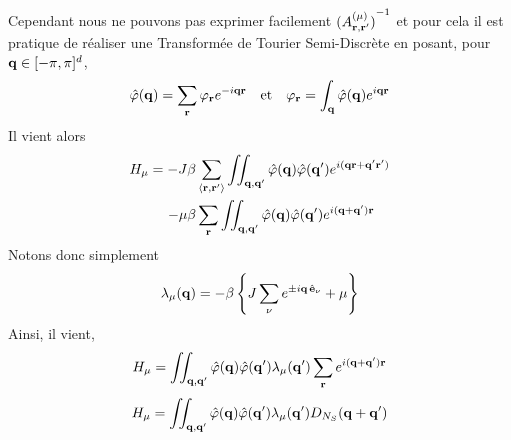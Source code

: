 \documentclass[10pt]{article}
\begin{document}
\begin{multicols}{2}
Cependant nous ne pouvons pas exprimer facilement ${(A_{{\bf r}, {\bf r}'}^{(\mu)})}^{-1}$ et pour cela il est pratique de réaliser une Transformée de Tourier Semi-Discrète   en posant, pour ${\bf q} \in [-\pi, \pi]^d$,
\begin{equation}
  \hat{\varphi}({\bf q}) = \sum_{\bf r} \varphi_{\bf r} e^{-i{\bf q}{\bf r}} \quad \text{et} \quad \varphi_{\bf r} = \int_{\bf q} \hat{\varphi}({\bf q})  e^{i{\bf q}{\bf r}}
\end{equation}
Il vient alors
\begin{equation}
\begin{split}
  H_\mu = -J\beta & \sum_{\left<{\bf r}, {\bf r}'\right>} \iint_{{\bf q},{\bf q}'} \hat{\varphi}({\bf q}) \hat{\varphi}({\bf q}')  e^{i({\bf q}{\bf r}+{\bf q}'{\bf r}')} \\
   -\mu\beta & \sum_{\bf r} \iint_{{\bf q},{\bf q}'} \hat{\varphi}({\bf q}) \hat{\varphi}({\bf q}')  e^{i({\bf q}+{\bf q}'){\bf r}}
\end{split}
\end{equation}
Notons donc simplement
\begin{equation}
  \lambda_\mu({\bf q}) = -\beta \left\{ J\sum_{\nu} e^{ \pm i {\bf q} \, \hat{\mathbf{e}}_\nu} +\mu \right\} 
\end{equation}
Ainsi, il vient, 
\begin{equation}
  H_\mu =   \iint_{{\bf q},{\bf q}'} \hat{\varphi}({\bf q}) \hat{\varphi}({\bf q}')   \lambda_\mu({\bf q}')   \sum_{{\bf r}}  e^{i({\bf q}+{\bf q}'){\bf r}} \\
\end{equation}
\begin{equation}
  H_\mu =   \iint_{\qv,\qv'} \hat{\varphi}(\qv) \hat{\varphi}(\qv')   \lambda_\mu(\qv')   D_{N_S}(\qv+\qv') \\

\end{equation}
\end{multicols}
\end{document}
